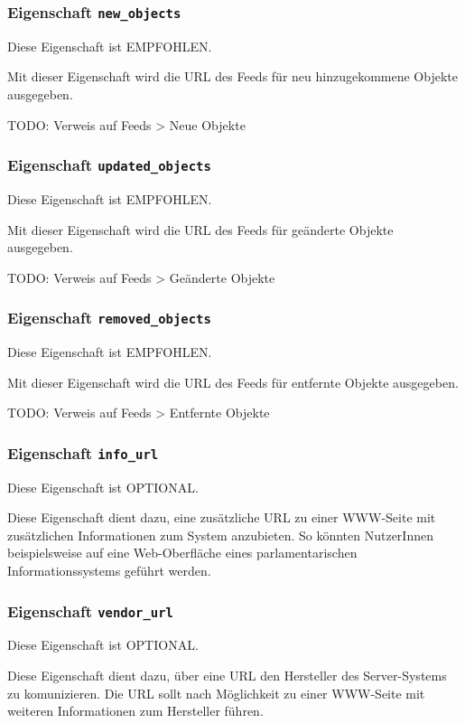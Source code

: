\documentclass[,a4paper]{article}
\begin{document}
\subsubsection{Eigenschaft \texttt{new\_objects}}

Diese Eigenschaft ist EMPFOHLEN.

Mit dieser Eigenschaft wird die URL des Feeds für neu hinzugekommene
Objekte ausgegeben.

TODO: Verweis auf Feeds \textgreater{} Neue Objekte

\subsubsection{Eigenschaft \texttt{updated\_objects}}

Diese Eigenschaft ist EMPFOHLEN.

Mit dieser Eigenschaft wird die URL des Feeds für geänderte Objekte
ausgegeben.

TODO: Verweis auf Feeds \textgreater{} Geänderte Objekte

\subsubsection{Eigenschaft \texttt{removed\_objects}}

Diese Eigenschaft ist EMPFOHLEN.

Mit dieser Eigenschaft wird die URL des Feeds für entfernte Objekte
ausgegeben.

TODO: Verweis auf Feeds \textgreater{} Entfernte Objekte

\subsubsection{Eigenschaft \texttt{info\_url}}

Diese Eigenschaft ist OPTIONAL.

Diese Eigenschaft dient dazu, eine zusätzliche URL zu einer WWW-Seite
mit zusätzlichen Informationen zum System anzubieten. So könnten
NutzerInnen beispielsweise auf eine Web-Oberfläche eines
parlamentarischen Informationssystems geführt werden.

\subsubsection{Eigenschaft \texttt{vendor\_url}}

Diese Eigenschaft ist OPTIONAL.

Diese Eigenschaft dient dazu, über eine URL den Hersteller des
Server-Systems zu komunizieren. Die URL sollt nach Möglichkeit zu einer
WWW-Seite mit weiteren Informationen zum Hersteller führen.
\end{document}
